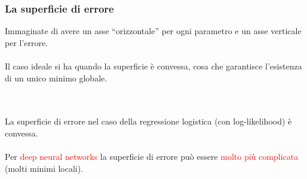 \documentclass[a4paper,12pt]{article}
\begin{document}
\subsubsection{La superficie di errore}
\begin{minipage}[c]{0.52\textwidth}
Immaginate di avere un asse ``orizzontale'' per ogni parametro e un asse verticale per l'errore.\\
\vspace{1px}\\
Il caso ideale si ha quando la superficie è convessa, cosa che garantisce l'esistenza di un unico minimo globale.
\end{minipage}
\hfill
\begin{minipage}[c]{0.44\textwidth}
\centering
{}
\end{minipage}\\
\vspace{1px}\\
La superficie di errore nel caso della regressione logistica (con log-likelihood) è convessa.\\
\vspace{1px}\\
Per \textcolor{red}{deep neural networks} la superficie di errore può essere \textcolor{red}{molto più complicata} (molti minimi locali).
\end{document}

